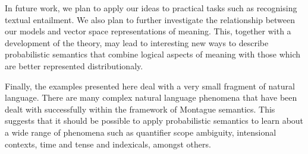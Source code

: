 \documentclass[11pt]{article}
\theoremstyle{definition}
\begin{document}


In future work, we plan to apply our ideas to practical tasks such as recognising textual entailment. We also plan to further investigate the relationship between our models and vector space representations of meaning. This, together with a development of the theory, may lead to interesting new ways to describe probabilistic semantics that combine logical aspects of meaning with those which are better represented distributionaly. 

Finally, the examples presented here deal with a very small fragment
of natural language. There are many complex natural language phenomena
that have been dealt with successfully within the framework of
Montague semantics. This suggests that it should be possible to apply
probabilistic semantics to learn about a wide range of phenomena such
as quantifier scope ambiguity, intensional contexts, time and tense
and indexicals, amongst others.





\end{document}
